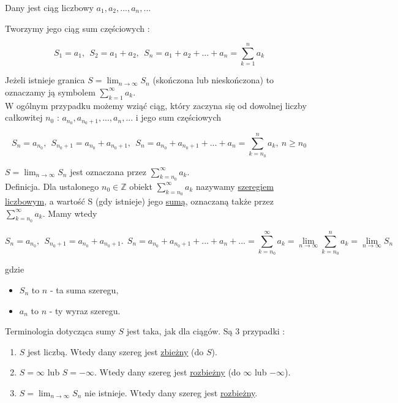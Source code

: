 \documentclass[12pt]{article}
\begin{document}
Dany jest ciąg liczbowy $ a_1, a_2, ..., a_n, ... $

Tworzymy jego ciąg sum częściowych :

$$ S_1 = a_1, \ \ S_2 = a_1 + a_2, \ \ S_n = a_1 + a_2 + ... + a_n = \sum\limits_{k = 1}^{n} a_k $$

Jeżeli istnieje granica $ S = \lim_{n \to \infty} S_n $ (skończona lub nieskończona) to oznaczamy ją symbolem 
$ \sum_{k = 1}^{\infty} a_k $. \\

W ogólnym przypadku możemy wziąć ciąg, który zaczyna się od dowolnej liczby całkowitej \linebreak $ n_0 $ : $ a_{n_0}, a_{n_0 + 1}, ..., a_n, ... $
i jego sum częściowych

$$ S_n = a_{n_0}, \ \ S_{n_0 + 1} = a_{n_0} + a_{n_0 + 1}, \ \ S_n = a_{n_0} + a_{n_0 + 1} + ... + a_n = \sum\limits_{k = n_0}^{n} a_k, \ n \geq n_0 $$

$ S = \lim_{n \to \infty} S_n $ jest oznaczana przez $ \sum\limits_{k = n_0}^{\infty} a_k $. \\

Definicja. Dla ustalonego $ n_0 \in \mathbb{Z} $ obiekt $ \sum\limits_{k = n_0}^{\infty} a_k $ nazywamy \underline{szeregiem liczbowym},
a wartość S (gdy istnieje) jego \underline{sumą}, oznaczaną także przez $ \sum\limits_{k = n_0}^{\infty} a_k $. Mamy wtedy

$$ S_n = a_{n_0}, \ \ S_{n_0 + 1} = a_{n_0} + a_{n_0 + 1}. \ \ S_n = a_{n_0} + a_{n_0 + 1} + ... + a_n + ... = 
\sum\limits_{k = n_0}^{\infty} a_k = \lim_{n \to \infty} \sum\limits_{k = n_0}^{n} a_k = \lim_{n \to \infty} S_n $$

gdzie

\begin{itemize}
    \item $ S_n $ to $n$ - ta suma szeregu,
    \item $ a_n $ to $n$ - ty wyraz szeregu. \\
\end{itemize}

Terminologia dotycząca sumy $S$ jest taka, jak dla ciągów. Są 3 przypadki : 

\begin{enumerate}
    \item $S$ jest liczbą. Wtedy dany szereg jest \underline{zbieżny} (do $S$).
    \item $S = \infty$ lub $S = -\infty$. Wtedy dany szereg jest \underline{rozbieżny} (do $\infty$ lub $-\infty$).
    \item $ S = \lim_{n \to \infty} S_n $ nie istnieje. Wtedy dany szereg jest \underline{rozbieżny}. \\
\end{enumerate}
\end{document}
